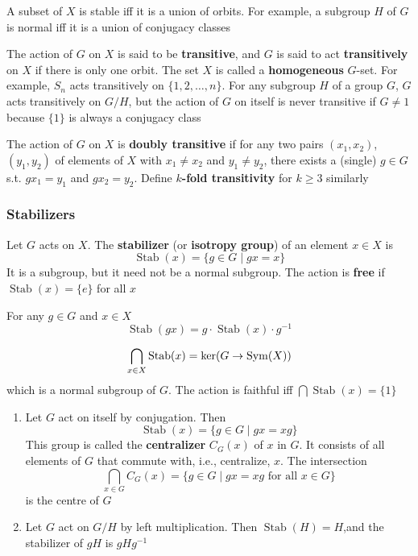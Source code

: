 \documentclass[11pt]{article}
\DeclareMathOperator{\Stab}{Stab}
\begin{document}
A subset of \(X\) is stable iff it is a union of orbits. For example, a subgroup \(H\) of \(G\)
is normal iff it is a union of conjugacy classes

The action of \(G\) on \(X\) is said to be \textbf{transitive}, and \(G\) is said to act \textbf{transitively}
on \(X\) if there is only one orbit. The set \(X\) is called a \textbf{homogeneous} \(G\)-set. For
example, \(S_n\) acts transitively on \(\{1,2,\dots,n\}\). For any subgroup \(H\) of a
group \(G\), \(G\) acts transitively on \(G/H\), but the action of \(G\) on itself is never
transitive if \(G\neq 1\) because \(\{1\}\) is always a conjugacy class

The action of \(G\) on \(X\) is \textbf{doubly transitive} if for any two pairs \((x_1,x_2)\), \((y_1,y_2)\)
of elements of \(X\) with \(x_1\neq x_2\) and \(y_1\neq y_2\), there exists a (single) \(g\in G\)
s.t. \(gx_1=y_1\) and \(gx_2=y_2\). Define \textbf{\(k\)-fold transitivity} for \(k\ge 3\) similarly

\subsubsection{Stabilizers}
\label{sec:org020caea}
Let \(G\) acts on \(X\). The \textbf{stabilizer} (or \textbf{isotropy group}) of an element \(x\in X\) is
\begin{equation*}
\Stab(x)=\{g\in G\mid gx=x\}
\end{equation*}
It is a subgroup, but it need not be a normal subgroup. The action is \textbf{free} if \(\Stab(x)=\{e\}\)
for all \(x\)

\begin{lemma}[]
\label{4.4}
For any \(g\in G\) and \(x\in X\)
\begin{equation*}
\Stab(gx)=g\cdot\Stab(x)\cdot g^{-1}
\end{equation*}
\end{lemma}


\begin{equation*}
\bigcap_{x\in X}\Stab(x)=\ker(G\to\Sym(X))
\end{equation*}
which is a normal subgroup of \(G\). The action is faithful iff \(\bigcap\Stab(x)=\{1\}\)

\begin{examplle}[]
\begin{enumerate}
\item Let \(G\) act on itself by conjugation. Then
\begin{equation*}
\Stab(x)=\{g\in G\mid gx=xg\}
\end{equation*}
This group is called the \textbf{centralizer} \(C_G(x)\) of \(x\) in \(G\). It consists of all
elements of \(G\) that commute with, i.e., centralize, \(x\). The intersection
\begin{equation*}
\bigcap_{x\in G}C_G(x)=\{g\in G\mid gx=xg\text{ for all }x\in G\}
\end{equation*}
is the centre of \(G\)
\item Let \(G\) act on \(G/H\) by left multiplication. Then \(\Stab(H)=H\),and the stabilizer
of \(gH\) is \(gHg^{-1}\)
\end{enumerate}
\end{examplle}
\end{document}
